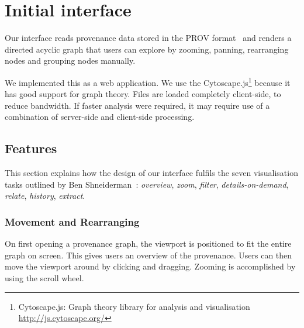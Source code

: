 \chapter{Initial interface}
\label{cha:initial_interface}

Our interface reads provenance data stored in the PROV format~\cite{primer2013} and renders a directed acyclic graph that users can explore by zooming, panning, rearranging nodes and grouping nodes manually. 

We implemented this as a web application. We use the Cytoscape.js\footnote{Cytoscape.js: Graph theory library for analysis and visualisation \url{http://js.cytoscape.org/}} because it has good support for graph theory. 
Files are loaded completely client-side, to reduce bandwidth. If faster analysis were required, it may require use of a combination of server-side and client-side processing.


\section{Features}

This section explains how the design of our interface fulfils the seven visualisation tasks outlined by Ben Shneiderman~\cite{Shneiderman1996}: \textit{overview}, \textit{zoom}, \textit{filter}, \textit{details-on-demand}, \textit{relate}, \textit{history}, \textit{extract}. 

\subsection{Movement and Rearranging}
On first opening a provenance graph, the viewport is positioned to fit the entire graph on screen. This gives users an overview of the provenance. Users can then move the viewport around by clicking and dragging. Zooming is accomplished by using the scroll wheel. 

